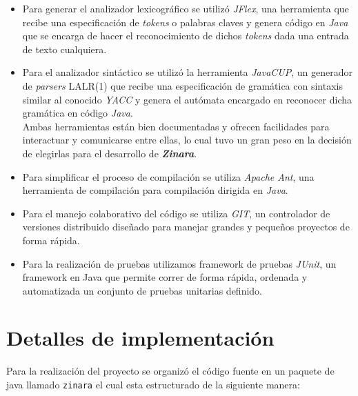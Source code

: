 \documentclass[12pt, spanish]{report}
\begin{document}
\begin{itemize}
\item Para generar el analizador lexicogr\'afico se utiliz\'o
  \emph{JFlex}\cite{jflex}, una herramienta que recibe una
  especificaci\'on de \emph{tokens} o palabras claves y genera c\'odigo en
  \emph{Java} que se encarga de hacer el reconocimiento de dichos
  \emph{tokens} dada una entrada de texto cualquiera.

\item Para el analizador sint\'actico se utiliz\'o la herramienta
  \emph{JavaCUP}\cite{javacup}, un generador de \emph{parsers} LALR(1)
  que recibe una especificaci\'on de gram\'atica con sintaxis similar
  al conocido \emph{YACC} y genera el aut\'omata encargado en
  reconocer dicha gram\'atica en c\'odigo \emph{Java}.\\

  Ambas herramientas est\'an bien documentadas y ofrecen facilidades
  para interactuar y comunicarse entre ellas, lo cual tuvo un gran
  peso en la decisi\'on de elegirlas para el desarrollo de
  \emph{\textbf{Zinara}}.

\item Para simplificar el proceso de compilaci\'on se utiliza
  \emph{Apache Ant}\cite{ant}, una herramienta de compilaci\'on para
  compilaci\'on dirigida en \emph{Java}.

\item Para el manejo colaborativo del c\'odigo se utiliza
  \emph{GIT}\cite{git}, un controlador de versiones distribuido
  dise\~nado para manejar grandes y peque\~nos proyectos de forma
  r\'apida.

\item Para la realizaci\'on de pruebas utilizamos framework de pruebas
  \emph{JUnit}, un framework en Java que permite correr de forma
  r\'apida, ordenada y automatizada un conjunto de pruebas unitarias
  definido.
\end{itemize}

\chapter{Detalles de implementaci\'on}
\label{sec:codigo}

Para la realizaci\'on del proyecto se organiz\'o el c\'odigo fuente en
un paquete de java llamado \texttt{zinara} el cual esta estructurado
de la siguiente manera:
\end{document}
